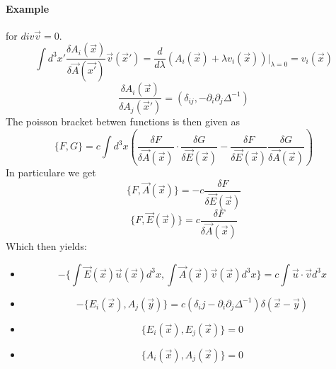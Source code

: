\documentclass{report}
\begin{document}
  \paragraph{Example} for $div \vec{v} = 0$. \[
    \int d^{3}x' \frac{\delta A_i\left( \vec{x} \right) }{\delta \vec{A}\left( \vec{x'} \right) } \vec{v}\left( \vec{x}' \right) = \frac{d}{d\lambda}\left( A_i\left( \vec{x} \right) + \lambda v_i\left( \vec{x} \right)  \right) |_{\lambda=0} = v_i\left( \vec{x} \right) 
  \] 
  \[
    \frac{\delta A_i\left( \vec{x} \right) }{\delta A_j\left( \vec{x}' \right) } = \left( \delta_{ij}, -\partial_i \partial_j \Delta^{-1}   \right) 
  \] 
The poisson bracket betwen functions is then given as \[
  \{F,G\} = c \int d^{3}x \left( \frac{\delta F}{\delta \vec{A}\left( \vec{x} \right) } \cdot \frac{\delta G}{\delta \vec{E}\left( \vec{x} \right) } - \frac{\delta F}{\delta \vec{E}\left( \vec{x} \right) } \frac{\delta G}{\delta \vec{A}\left( \vec{x} \right) } \right) 
\] 
In particulare we get \[
  \{F, \vec{A}\left( \vec{x} \right) \} = -c \frac{\delta F}{\delta \vec{E}\left( \vec{x} \right) } 
\] \[
\{F, \vec{E}\left( \vec{x} \right) \} = c \frac{\delta F}{\delta \vec{A}\left( \vec{x} \right) }
\] 
Which then yields:
\begin{itemize}
  \item  \[
-\{ 
  \int \vec{E}\left( \vec{x} \right) \vec{u}\left( \vec{x} \right) d^{3}x ,
\int \vec{A}\left( \vec{x} \right) \vec{v}\left( \vec{x} \right) d^{3}x \} = c \int \vec{u} \cdot \vec{v} d^{3}x
\] 
\item \[
    -\{ E_i\left( \vec{x} \right) , A_j\left( \vec{y} \right) \} = c \left( \delta_ij - \partial_i \partial_j \Delta^{-1}   \right) \delta\left( \vec{x} - \vec{y} \right) 
\] 
\item \[
    \{E_i\left( \vec{x} \right) , E_j\left( \vec{x} \right) \} = 0
\] 
\item \[
    \{A_i\left( \vec{x} \right) , A_j\left( \vec{x} \right) \} = 0
\] 
\end{itemize}
\end{document}
